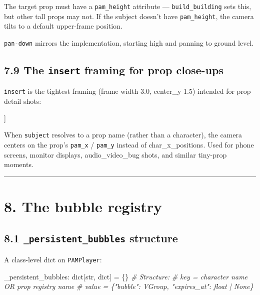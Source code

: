 \documentclass[
  11pt,
]{book}
\newenvironment{Shaded}{}{}
\newcommand{\BuiltInTok}[1]{\textcolor[rgb]{0.00,0.50,0.00}{#1}}
\newcommand{\CommentTok}[1]{\textcolor[rgb]{0.38,0.63,0.69}{\textit{#1}}}
\newcommand{\NormalTok}[1]{#1}
\newcommand{\OperatorTok}[1]{\textcolor[rgb]{0.40,0.40,0.40}{#1}}
\begin{document}
The target prop must have a \texttt{pam\_height} attribute ---
\texttt{build\_building} sets this, but other tall props may not. If the
subject doesn't have \texttt{pam\_height}, the camera tilts to a default
upper-frame position.

\texttt{pan-down} mirrors the implementation, starting high and panning
to ground level.

\subsection{\texorpdfstring{7.9 The \texttt{insert} framing for prop
close-ups}{7.9 The insert framing for prop close-ups}}\label{the-insert-framing-for-prop-close-ups}

\texttt{insert} is the tightest framing (frame width 3.0, center\_y 1.5)
intended for prop detail shots:

\begin{Shaded}
\begin{Highlighting}[]
\NormalTok{[[ CAMERA: FRAMING=insert | SUBJECT=smartphone | MOVE=null | TRANSITION=cut ]]}
\end{Highlighting}
\end{Shaded}

When \texttt{subject} resolves to a prop name (rather than a character),
the camera centers on the prop's \texttt{pam\_x} / \texttt{pam\_y}
instead of char\_x\_positions. Used for phone screens, monitor displays,
audio\_video\_bug shots, and similar tiny-prop moments.

\begin{center}\rule{0.5\linewidth}{0.5pt}\end{center}

\section{8. The bubble registry}\label{the-bubble-registry}

\subsection{\texorpdfstring{8.1 \texttt{\_persistent\_bubbles}
structure}{8.1 \_persistent\_bubbles structure}}\label{persistent_bubbles-structure}

A class-level dict on \texttt{PAMPlayer}:

\begin{Shaded}
\begin{Highlighting}[]
\NormalTok{\_persistent\_bubbles: }\BuiltInTok{dict}\NormalTok{[}\BuiltInTok{str}\NormalTok{, }\BuiltInTok{dict}\NormalTok{] }\OperatorTok{=}\NormalTok{ \{\}}
\CommentTok{\# Structure:}
\CommentTok{\#   key   = character name OR prop registry name}
\CommentTok{\#   value = \{"bubble": VGroup, "expires\_at": float | None\}}
\end{Highlighting}
\end{Shaded}
\end{document}
